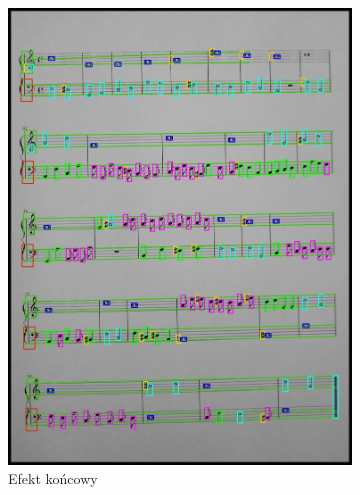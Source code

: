 \documentclass[12pt]{article}
\begin{document}
\begin{figure}[h!]
\begin{subfigure}[b]{0.32\linewidth}
				\includegraphics[width=\linewidth]{zdj/step_5.jpg}
				\caption{Efekt końcowy}
			\end{subfigure}
			\begin{subfigure}[b]{0.32\linewidth}

\end{subfigure}
\end{figure}
\end{document}
